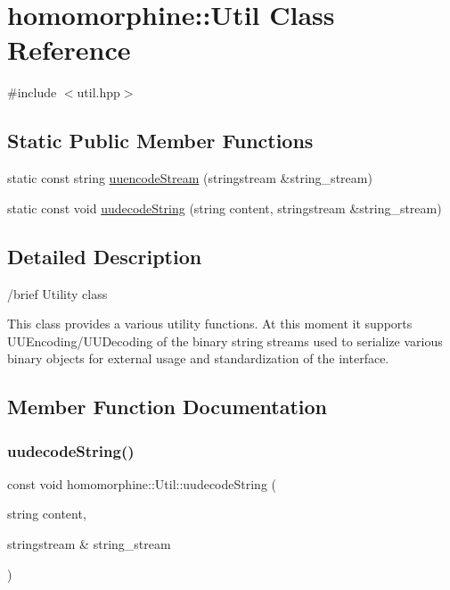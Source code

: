 \hypertarget{classhomomorphine_1_1_util}{}\section{homomorphine\+::Util Class Reference}
\label{classhomomorphine_1_1_util}


{\ttfamily \#include $<$util.\+hpp$>$}

\subsection*{Static Public Member Functions}
\begin{DoxyCompactItemize}
\item 
static const string \mbox{\hyperlink{classhomomorphine_1_1_util_a26f29995aa48f4374993ec4afeca2ac8}{uuencode\+Stream}} (stringstream \&string\+\_\+stream)
\item 
static const void \mbox{\hyperlink{classhomomorphine_1_1_util_aba5af6d7356aca8c70ae4fb1e5d36b70}{uudecode\+String}} (string content, stringstream \&string\+\_\+stream)
\end{DoxyCompactItemize}


\subsection{Detailed Description}
/brief Utility class

This class provides a various utility functions. At this moment it supports U\+U\+Encoding/\+U\+U\+Decoding of the binary string streams used to serialize various binary objects for external usage and standardization of the interface. 

\subsection{Member Function Documentation}
\mbox{\label{classhomomorphine_1_1_util_aba5af6d7356aca8c70ae4fb1e5d36b70}} 
\subsubsection{\texorpdfstring{uudecodeString()}{uudecodeString()}}
{\footnotesize\ttfamily const void homomorphine\+::\+Util\+::uudecode\+String (\begin{DoxyParamCaption}\item[{string}]{content,  }\item[{stringstream \&}]{string\+\_\+stream }\end{DoxyParamCaption})\hspace{0.3cm}{\ttfamily [static]}}

